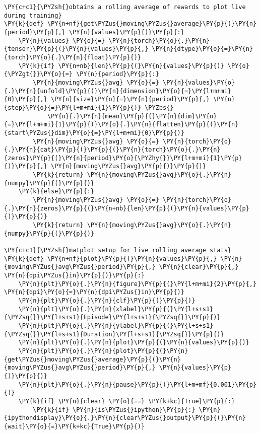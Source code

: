     \begin{tcolorbox}[breakable, size=fbox, boxrule=1pt, pad at break*=1mm,colback=cellbackground, colframe=cellborder]
\begin{Verbatim}[commandchars=\\\{\}]
\PY{c+c1}{\PYZsh{}obtains a rolling average of rewards to plot live during training}
\PY{k}{def} \PY{n+nf}{get\PYZus{}moving\PYZus{}average}\PY{p}{(}\PY{n}{period}\PY{p}{,} \PY{n}{values}\PY{p}{)}\PY{p}{:}
    \PY{n}{values} \PY{o}{=} \PY{n}{torch}\PY{o}{.}\PY{n}{tensor}\PY{p}{(}\PY{n}{values}\PY{p}{,} \PY{n}{dtype}\PY{o}{=}\PY{n}{torch}\PY{o}{.}\PY{n}{float}\PY{p}{)}
    \PY{k}{if} \PY{n+nb}{len}\PY{p}{(}\PY{n}{values}\PY{p}{)} \PY{o}{\PYZgt{}}\PY{o}{=} \PY{n}{period}\PY{p}{:}
        \PY{n}{moving\PYZus{}avg} \PY{o}{=} \PY{n}{values}\PY{o}{.}\PY{n}{unfold}\PY{p}{(}\PY{n}{dimension}\PY{o}{=}\PY{l+m+mi}{0}\PY{p}{,} \PY{n}{size}\PY{o}{=}\PY{n}{period}\PY{p}{,} \PY{n}{step}\PY{o}{=}\PY{l+m+mi}{1}\PY{p}{)} \PYZbs{}
            \PY{o}{.}\PY{n}{mean}\PY{p}{(}\PY{n}{dim}\PY{o}{=}\PY{l+m+mi}{1}\PY{p}{)}\PY{o}{.}\PY{n}{flatten}\PY{p}{(}\PY{n}{start\PYZus{}dim}\PY{o}{=}\PY{l+m+mi}{0}\PY{p}{)}
        \PY{n}{moving\PYZus{}avg} \PY{o}{=} \PY{n}{torch}\PY{o}{.}\PY{n}{cat}\PY{p}{(}\PY{p}{(}\PY{n}{torch}\PY{o}{.}\PY{n}{zeros}\PY{p}{(}\PY{n}{period}\PY{o}{\PYZhy{}}\PY{l+m+mi}{1}\PY{p}{)}\PY{p}{,} \PY{n}{moving\PYZus{}avg}\PY{p}{)}\PY{p}{)}
        \PY{k}{return} \PY{n}{moving\PYZus{}avg}\PY{o}{.}\PY{n}{numpy}\PY{p}{(}\PY{p}{)}
    \PY{k}{else}\PY{p}{:}
        \PY{n}{moving\PYZus{}avg} \PY{o}{=} \PY{n}{torch}\PY{o}{.}\PY{n}{zeros}\PY{p}{(}\PY{n+nb}{len}\PY{p}{(}\PY{n}{values}\PY{p}{)}\PY{p}{)}
        \PY{k}{return} \PY{n}{moving\PYZus{}avg}\PY{o}{.}\PY{n}{numpy}\PY{p}{(}\PY{p}{)}

\PY{c+c1}{\PYZsh{}matplot setup for live rolling average stats}
\PY{k}{def} \PY{n+nf}{plot}\PY{p}{(}\PY{n}{values}\PY{p}{,} \PY{n}{moving\PYZus{}avg\PYZus{}period}\PY{p}{,} \PY{n}{clear}\PY{p}{,} \PY{n}{dpi\PYZus{}in}\PY{p}{)}\PY{p}{:}
    \PY{n}{plt}\PY{o}{.}\PY{n}{figure}\PY{p}{(}\PY{l+m+mi}{2}\PY{p}{,} \PY{n}{dpi}\PY{o}{=}\PY{n}{dpi\PYZus{}in}\PY{p}{)}
    \PY{n}{plt}\PY{o}{.}\PY{n}{clf}\PY{p}{(}\PY{p}{)}        
    \PY{n}{plt}\PY{o}{.}\PY{n}{xlabel}\PY{p}{(}\PY{l+s+s1}{\PYZsq{}}\PY{l+s+s1}{Episode}\PY{l+s+s1}{\PYZsq{}}\PY{p}{)}
    \PY{n}{plt}\PY{o}{.}\PY{n}{ylabel}\PY{p}{(}\PY{l+s+s1}{\PYZsq{}}\PY{l+s+s1}{Duration}\PY{l+s+s1}{\PYZsq{}}\PY{p}{)}
    \PY{n}{plt}\PY{o}{.}\PY{n}{plot}\PY{p}{(}\PY{n}{values}\PY{p}{)}
    \PY{n}{plt}\PY{o}{.}\PY{n}{plot}\PY{p}{(}\PY{n}{get\PYZus{}moving\PYZus{}average}\PY{p}{(}\PY{n}{moving\PYZus{}avg\PYZus{}period}\PY{p}{,} \PY{n}{values}\PY{p}{)}\PY{p}{)}
    \PY{n}{plt}\PY{o}{.}\PY{n}{pause}\PY{p}{(}\PY{l+m+mf}{0.001}\PY{p}{)}
    \PY{k}{if} \PY{n}{clear} \PY{o}{==} \PY{k+kc}{True}\PY{p}{:}
        \PY{k}{if} \PY{n}{is\PYZus{}ipython}\PY{p}{:} \PY{n}{ipythondisplay}\PY{o}{.}\PY{n}{clear\PYZus{}output}\PY{p}{(}\PY{n}{wait}\PY{o}{=}\PY{k+kc}{True}\PY{p}{)}
\end{Verbatim}
\end{tcolorbox}

